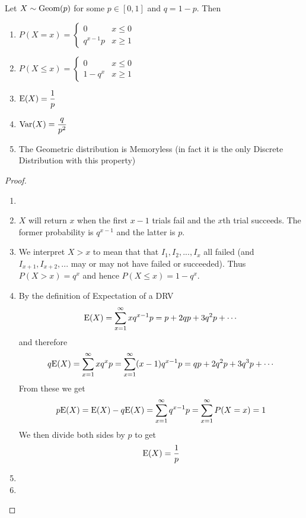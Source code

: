 \documentclass{report}
\begin{document}
    \begin{theorem}
        Let $X\sim \geom(p)$ for some $p\in [0,1]$ and $q=1-p$. Then
        \begin{enumerate}
            \item 
            $
                P(X=x)=\begin{cases}
                    0 & x \le 0
                    \\
                    q^{x-1}p & x\ge 1
                    
                \end{cases}
            $
            \item 
            $
                P(X\le x)=\begin{cases}
                    0 & x \le 0
                    \\
                    1-q^x & x\ge 1
                \end{cases}
            $
            \item $\E(X)=\displaystyle\frac 1 p$
            \item $\Var(X)=\displaystyle \frac q {p^2}$
            \item The Geometric distribution is Memoryless (in fact it is the only Discrete Distribution with this property)
        \end{enumerate}
        \begin{proof}
            \begin{enumerate}
                \item[]
                \item $X$ will return $x$ when the first $x-1$ trials fail and the $x$th trial succeeds. The former probability is $q^{x-1}$ and the latter is $p$.
                \item We interpret $X>x$ to mean that that $I_1,I_2,...,I_x$ all failed (and $I_{x+1}, I_{x+2},...$ may or may not have failed or succeeded). Thus $P(X>x)=q^x$ and hence $P(X\le x)=1-q^x$.
                \item By the definition of Expectation of a DRV
                \[
                    \E(X)=\sum_{x=1}^\infty xq^{x-1}p=p+2qp+3q^2p+\cdots
                \]
                and therefore
                \[
                    q\E(X)=\sum_{x=1}^\infty xq^x p=\sum_{x=1}^\infty (x-1)q^{x-1} p =  qp+2q^2p+3q^3p+\cdots
                \]
                From these we get
                \[
                    p\E(X)=\E(X)-q\E(X)=\sum_{x=1}^\infty q^{x-1}p=\sum_{x=1}^\infty P(X=x)=1
                \]
                We then divide both sides by $p$ to get
                \[
                    \E(X)=\frac 1p
                \]
                \item \todo
                \item \todo
            \end{enumerate}
        \end{proof}
    \end{theorem}
\end{document}
